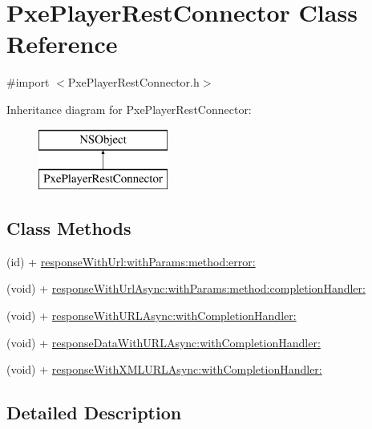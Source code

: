 \hypertarget{interface_pxe_player_rest_connector}{\section{Pxe\-Player\-Rest\-Connector Class Reference}
\label{interface_pxe_player_rest_connector}
}


{\ttfamily \#import $<$Pxe\-Player\-Rest\-Connector.\-h$>$}

Inheritance diagram for Pxe\-Player\-Rest\-Connector\-:\begin{figure}[H]
\begin{center}
\leavevmode
\includegraphics[height=2.000000cm]{interface_pxe_player_rest_connector}
\end{center}
\end{figure}
\subsection*{Class Methods}
\begin{DoxyCompactItemize}
\item 
(id) + \hyperlink{interface_pxe_player_rest_connector_aacb027c2407c5c21e5219d66bff46e2d}{response\-With\-Url\-:with\-Params\-:method\-:error\-:}
\item 
(void) + \hyperlink{interface_pxe_player_rest_connector_a7eca6e1a741f78fc80ad8664c8b336e5}{response\-With\-Url\-Async\-:with\-Params\-:method\-:completion\-Handler\-:}
\item 
(void) + \hyperlink{interface_pxe_player_rest_connector_a1c34113cf1bb35f1aedb9db6d19710f5}{response\-With\-U\-R\-L\-Async\-:with\-Completion\-Handler\-:}
\item 
(void) + \hyperlink{interface_pxe_player_rest_connector_a595dc3781bfc62df73ebd11a49c9bc18}{response\-Data\-With\-U\-R\-L\-Async\-:with\-Completion\-Handler\-:}
\item 
(void) + \hyperlink{interface_pxe_player_rest_connector_a9f4147dbbed5182a2df16b483f0f1256}{response\-With\-X\-M\-L\-U\-R\-L\-Async\-:with\-Completion\-Handler\-:}
\end{DoxyCompactItemize}


\subsection{Detailed Description}


